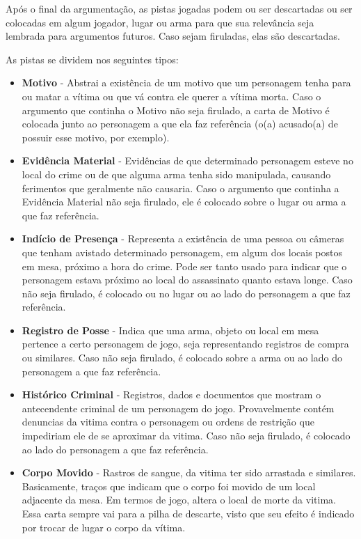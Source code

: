 \documentclass[a4paper, 11pt]{article}
\begin{document}
		Após o final da argumentação, as pistas jogadas podem ou ser descartadas ou ser colocadas em algum jogador, lugar ou arma para que sua relevância seja lembrada para argumentos futuros. Caso sejam firuladas, elas são descartadas.
		
		As pistas se dividem nos seguintes tipos:

		\begin{itemize}
			\item \textbf{Motivo} - Abstrai a existência de um motivo que um personagem tenha para ou matar a vítima ou que vá contra ele querer a vítima morta. Caso o argumento que continha o Motivo não seja firulado, a carta de Motivo é colocada junto ao personagem a que ela faz referência (o(a) acusado(a) de possuir esse motivo, por exemplo).
			\item \textbf{Evidência Material} -  Evidências de que determinado personagem esteve no local do crime ou de que alguma arma tenha sido manipulada, causando ferimentos que geralmente não causaria. Caso o argumento que continha a Evidência Material não seja firulado, ele é colocado sobre o lugar ou arma a que faz referência.
			\item \textbf{Indício de Presença} - Representa a existência de uma pessoa ou câmeras que tenham avistado determinado personagem, em algum dos locais postos em mesa, próximo a hora do crime. Pode ser tanto usado para indicar que o personagem estava próximo ao local do assassinato quanto estava longe. Caso não seja firulado, é colocado ou no lugar ou ao lado do personagem a que faz referência.
			\item \textbf{Registro de Posse} - Indica que uma arma, objeto ou local em mesa pertence a certo personagem de jogo, seja representando registros de compra ou similares. Caso não seja firulado, é colocado sobre a arma ou ao lado do personagem a que faz referência.
			\item \textbf{Histórico Criminal} - Registros, dados e documentos que mostram o antecendente criminal de um personagem do jogo. Provavelmente contém denuncias da vitima contra o personagem ou ordens de restrição que impediriam ele de se aproximar da vitima. Caso não seja firulado, é colocado ao lado do personagem a que faz referência.
			\item \textbf{Corpo Movido} - Rastros de sangue, da vitima ter sido arrastada e similares. Basicamente, traços que indicam que o corpo foi movido de um local adjacente da mesa. Em termos de jogo, altera o local de morte da vitima. Essa carta sempre vai para a pilha de descarte, visto que seu efeito é indicado por trocar de lugar o corpo da vítima.

\end{itemize}
\end{document}
